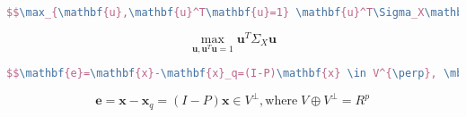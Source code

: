   \begin{lstlisting}[language=TeX,numbers=none,frame=lrtb,keywords={begin},label=bast,caption=\song 最佳化问题] 
   $$\max_{\mathbf{u},\mathbf{u}^T\mathbf{u}=1} \mathbf{u}^T\Sigma_X\mathbf{u}$$
  \end{lstlisting} 
  $$\max_{\mathbf{u},\mathbf{u}^T\mathbf{u}=1} \mathbf{u}^T\Sigma_X\mathbf{u}$$
  
  \begin{lstlisting}[language=TeX,numbers=none,frame=lrtb,keywords={begin},label=somesymbles,caption=\song 几个符号]
  $$\mathbf{e}=\mathbf{x}-\mathbf{x}_q=(I-P)\mathbf{x} \in V^{\perp}, \mbox{where}\; V\oplus V^{\perp}=R^p $$
  \end{lstlisting} 
  $$\mathbf{e}=\mathbf{x}-\mathbf{x}_q=(I-P)\mathbf{x} \in V^{\perp}, \mbox{where}\; V\oplus V^{\perp}=R^p $$


